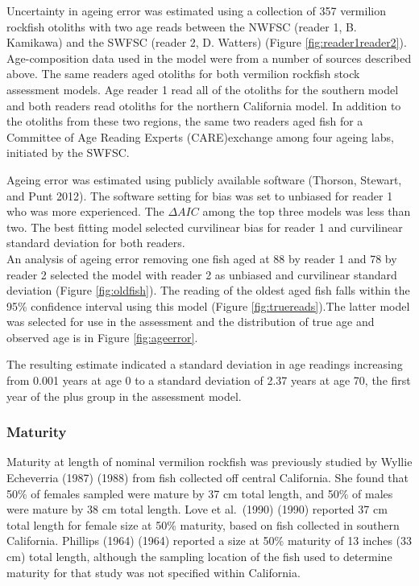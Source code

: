 \documentclass[
  english,
  a4paper,
]{article}
\begin{document}
Uncertainty in ageing error was estimated using a collection of 357 vermilion rockfish
otoliths with two age reads between the NWFSC (reader 1, B. Kamikawa) and the
SWFSC (reader 2, D. Watters) (Figure \ref{fig:reader1reader2}).
Age-composition data used in the model were from a number of sources described
above. The same readers aged otoliths for both vermilion rockfish stock assessment models.
Age reader 1 read all of the otoliths for the southern model and both readers read
otoliths for the northern California model. In addition to the otoliths from these
two regions, the same two readers aged fish for a Committee of Age Reading Experts
(CARE)exchange among four ageing labs, initiated by the SWFSC.

Ageing error was estimated using publicly available software (Thorson, Stewart, and Punt 2012).
The software setting for bias was set to unbiased for reader 1 who was more
experienced. The \(\Delta AIC\) among the top three models was less than two. The
best fitting model selected curvilinear bias for reader 1 and curvilinear standard
deviation for both readers.\\
An analysis of ageing error removing one fish aged at 88 by reader 1 and 78 by reader 2
selected the model with reader 2 as unbiased and curvilinear standard deviation
(Figure \ref{fig:oldfish}). The reading of the oldest aged fish falls within the 95\% confidence
interval using this model (Figure \ref{fig:truereads}).The latter model was selected
for use in the assessment and the distribution of true age and observed
age is in Figure \ref{fig:ageerror}.

The resulting estimate indicated a standard deviation in age readings
increasing from 0.001 years at age 0 to a standard deviation of 2.37 years at age 70,
the first year of the plus group in the assessment model.

\hypertarget{maturity}{%
\subsubsection{Maturity}\label{maturity}}

Maturity at length of nominal vermilion rockfish was previously studied by Wyllie Echeverria (1987) (1988) from fish collected off central California. She found that 50\% of females sampled were mature by 37 cm total length, and 50\% of males were mature by 38 cm total length. Love et al.~(1990) (1990) reported 37 cm total length for female size at 50\% maturity, based on fish collected in southern California. Phillips (1964) (1964) reported a size at 50\% maturity of 13 inches (33 cm) total length, although the sampling location of the fish used to determine maturity for that study was not specified within California.
\end{document}
